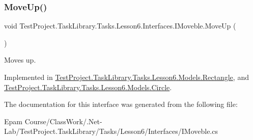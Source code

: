 \mbox{\label{interface_test_project_1_1_task_library_1_1_tasks_1_1_lesson6_1_1_interfaces_1_1_i_moveble_a2be55236c78ebdcac42f22d31abdf18e}} 
\subsubsection{\texorpdfstring{MoveUp()}{MoveUp()}}
{\footnotesize\ttfamily void Test\+Project.\+Task\+Library.\+Tasks.\+Lesson6.\+Interfaces.\+I\+Moveble.\+Move\+Up (\begin{DoxyParamCaption}{ }\end{DoxyParamCaption})}



Moves up. 



Implemented in \mbox{\hyperlink{class_test_project_1_1_task_library_1_1_tasks_1_1_lesson6_1_1_models_1_1_rectangle_a67786139a7e5f852c0442423c6a52418}{Test\+Project.\+Task\+Library.\+Tasks.\+Lesson6.\+Models.\+Rectangle}}, and \mbox{\hyperlink{class_test_project_1_1_task_library_1_1_tasks_1_1_lesson6_1_1_models_1_1_circle_a3b0881cfdf932fb6bc56cf8c99fb110b}{Test\+Project.\+Task\+Library.\+Tasks.\+Lesson6.\+Models.\+Circle}}.



The documentation for this interface was generated from the following file\+:\begin{DoxyCompactItemize}
\item 
Epam Course/\+Class\+Work/.\+Net-\/\+Lab/\+Test\+Project.\+Task\+Library/\+Tasks/\+Lesson6/\+Interfaces/I\+Moveble.\+cs\end{DoxyCompactItemize}
